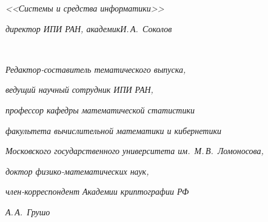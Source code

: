 \textit{<<Системы и средства информатики>>}\\[-13pt]





\noindent


\textit{директор ИПИ РАН, академик}\hfill \textit{И.\,А.~Соколов}


     \\





\noindent


\textit{Редактор-составитель тематического выпуска,}\\[-13pt]





\noindent 


\textit{ведущий научный сотрудник ИПИ РАН,}\\[-13pt]





\noindent


\textit{профессор кафедры математической статистики}\\[-13pt]





\noindent 


\textit{факультета вычислительной математики и кибернетики}\\[-13pt] 





\noindent


\textit{Московского государственного университета им.\ М.\,В.~Ломоносова,}\\[-13pt]





\noindent


\textit{доктор физико-математических наук,}





\noindent  


\textit{член-корреспондент Академии криптографии РФ}\hfill


\textit{А.\,А.~Грушо}


